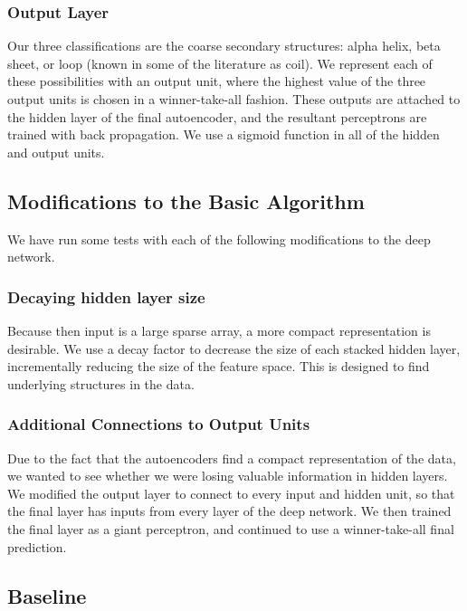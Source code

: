 \documentclass[]{article}
\begin{document}
\subsubsection{Output Layer}
Our three classifications are the coarse secondary structures: alpha helix, beta sheet, or loop (known in some of the literature as coil).
We represent each of these possibilities with an output unit, where the highest value of the three output units is chosen in a winner-take-all fashion.
These outputs are attached to the hidden layer of the final autoencoder, and the resultant perceptrons are trained with back propagation.
We use a sigmoid function in all of the hidden and output units.

\subsection{Modifications to the Basic Algorithm}
We have run some tests with each of the following modifications to the deep network.

\subsubsection{Decaying hidden layer size}
Because then input is a large sparse array, a more compact representation is desirable.
We use a decay factor to decrease the size of each stacked hidden layer, incrementally reducing the size of the feature space.
This is designed to find underlying structures in the data.

\subsubsection{Additional Connections to Output Units}
Due to the fact that the autoencoders find a compact representation of the data, we wanted to see whether we were losing valuable information in hidden layers.
We modified the output layer to connect to every input and hidden unit, so that the final layer has inputs from every layer of the deep network.
We then trained the final layer as a giant perceptron, and continued to use a winner-take-all final prediction.

\subsection{Baseline}
\end{document}
